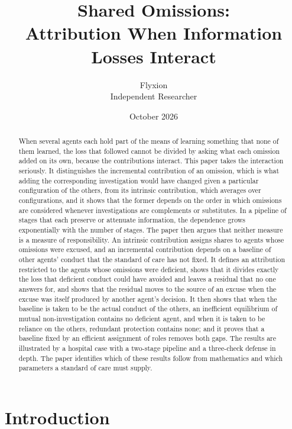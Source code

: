 \documentclass[11pt]{article}
\title{Shared Omissions:\\Attribution When Information Losses Interact}
\author{Flyxion\\Independent Researcher}
\date{October 2026}
\theoremstyle{plain}
\theoremstyle{definition}
\begin{document}
\maketitle

\begin{abstract}
\noindent When several agents each hold part of the means of learning something that none of them learned, the loss that followed cannot be divided by asking what each omission added on its own, because the contributions interact. This paper takes the interaction seriously. It distinguishes the incremental contribution of an omission, which is what adding the corresponding investigation would have changed given a particular configuration of the others, from its intrinsic contribution, which averages over configurations, and it shows that the former depends on the order in which omissions are considered whenever investigations are complements or substitutes. In a pipeline of stages that each preserve or attenuate information, the dependence grows exponentially with the number of stages. The paper then argues that neither measure is a measure of responsibility. An intrinsic contribution assigns shares to agents whose omissions were excused, and an incremental contribution depends on a baseline of other agents' conduct that the standard of care has not fixed. It defines an attribution restricted to the agents whose omissions were deficient, shows that it divides exactly the loss that deficient conduct could have avoided and leaves a residual that no one answers for, and shows that the residual moves to the source of an excuse when the excuse was itself produced by another agent's decision. It then shows that when the baseline is taken to be the actual conduct of the others, an inefficient equilibrium of mutual non-investigation contains no deficient agent, and when it is taken to be reliance on the others, redundant protection contains none; and it proves that a baseline fixed by an efficient assignment of roles removes both gaps. The results are illustrated by a hospital case with a two-stage pipeline and a three-check defense in depth. The paper identifies which of these results follow from mathematics and which parameters a standard of care must supply.
\end{abstract}

\section{Introduction}\label{sec:intro}
\end{document}
